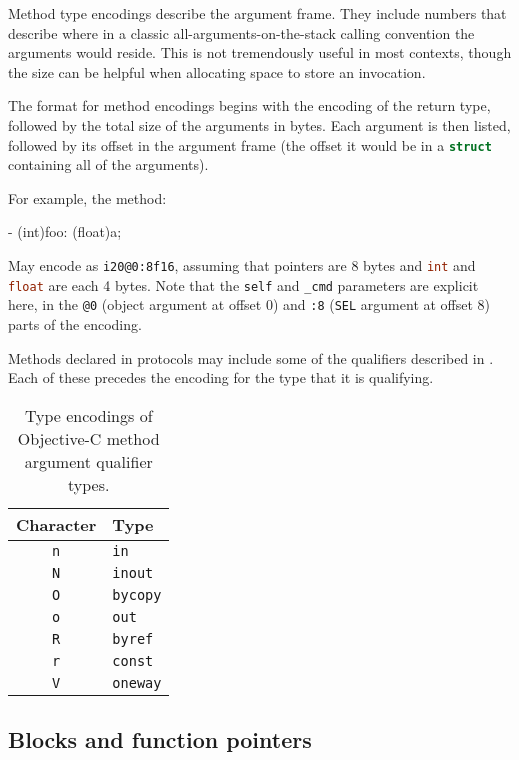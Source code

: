 \documentclass[a4paper]{report}
\newcommand{\ccode}[1]{\lstinline[language={C}]{#1}}
\newcommand{\objc}[1]{\lstinline[language={[Objective]C}]{#1}}
\begin{document}
Method type encodings describe the argument frame.
They include numbers that describe where in a classic all-arguments-on-the-stack calling convention the arguments would reside.
This is not tremendously useful in most contexts, though the size can be helpful when allocating space to store an invocation.

The format for method encodings begins with the encoding of the return type, followed by the total size of the arguments in bytes.
Each argument is then listed, followed by its offset in the argument frame (the offset it would be in a \ccode{struct} containing all of the arguments).

For example, the method:
\begin{codesnippet}
- (int)foo: (float)a;
\end{codesnippet}

May encode as \texttt{i20@0:8f16}, assuming that pointers are 8 bytes and \ccode{int} and \ccode{float} are each 4 bytes.
Note that the \objc{self} and \objc{_cmd} parameters are explicit here, in the \texttt{@0} (object argument at offset 0) and \texttt{:8} (\objc{SEL} argument at offset 8) parts of the encoding.

Methods declared in protocols may include some of the qualifiers described in .
Each of these precedes the encoding for the type that it is qualifying.

\begin{table}
	\begin{center}
		\begin{tabular}{c|l}
			Character   & Type\\\hline
			\texttt{n} & \objc{in} \\
			\texttt{N} & \objc{inout} \\
			\texttt{O} & \objc{bycopy} \\
			\texttt{o} & \objc{out} \\
			\texttt{R} & \objc{byref} \\
			\texttt{r} & \objc{const} \\
			\texttt{V} & \objc{oneway}
		\end{tabular}
		\caption{\label{tab:objcqualencode}Type encodings of Objective-C method argument qualifier types.}
	\end{center}
\end{table}

\subsection{Blocks and function pointers}
\end{document}
